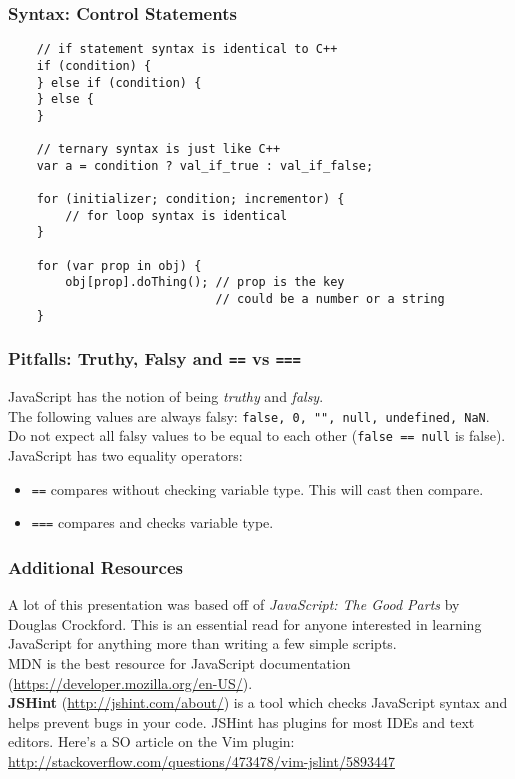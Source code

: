 \documentclass{lug}
\begin{document}
\begin{frame}[fragile]
    \frametitle{Syntax: Control Statements}

    \begin{verbatim}
    // if statement syntax is identical to C++
    if (condition) {
    } else if (condition) {
    } else {
    }

    // ternary syntax is just like C++
    var a = condition ? val_if_true : val_if_false;

    for (initializer; condition; incrementor) {
        // for loop syntax is identical
    }

    for (var prop in obj) {
        obj[prop].doThing(); // prop is the key
                             // could be a number or a string
    }
    \end{verbatim}
\end{frame}

\begin{frame}
    \frametitle{Pitfalls: Truthy, Falsy and \texttt{==} vs \texttt{===}}

    JavaScript has the notion of being \textit{truthy} and \textit{falsy}.\\ 
 
    The following values are always falsy: \texttt{false, 0, "", null, undefined, NaN}. \\ 
 
    Do not expect all falsy values to be equal to each other (\texttt{false == null} is false). \\ 

    JavaScript has two equality operators:
    \begin{itemize}
        \item \texttt{==} compares without checking variable type. This will cast then compare.
        \item \texttt{===} compares and checks variable type.
    \end{itemize}
\end{frame}

\begin{frame}
    \frametitle{Additional Resources}

    A lot of this presentation was based off of \textit{JavaScript: The Good Parts} by Douglas
    Crockford. This is an essential read for anyone interested in learning JavaScript for anything
    more than writing a few simple scripts.\\

    MDN is the best resource for JavaScript documentation
    (\url{https://developer.mozilla.org/en-US/}). \\

    \textbf{JSHint} (\url{http://jshint.com/about/}) is a tool which checks JavaScript syntax and
    helps prevent bugs in your code. JSHint has plugins for most IDEs and text editors. Here's a SO
    article on the Vim plugin: \url{http://stackoverflow.com/questions/473478/vim-jslint/5893447}\\

\end{frame}
\end{document}
